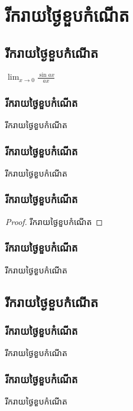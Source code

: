 \documentclass[11pt,a4paper]{diamond}
\begin{document}
	\frontmatter
	\tableofcontents
	\mainmatter
	\part{រីករាយថ្ងៃខួបកំណើត}
	\chapter{រីករាយថ្ងៃខួបកំណើត}
	\begin{definition}
		$\lim_{x\to0}\frac{\sin ax}{ax}$
	\end{definition}
	\section{រីករាយថ្ងៃខួបកំណើត}
	\begin{example}
		រីករាយថ្ងៃខួបកំណើត
	\end{example}
	\section{រីករាយថ្ងៃខួបកំណើត}
	\begin{theorem}
		រីករាយថ្ងៃខួបកំណើត
	\end{theorem}
	\section{រីករាយថ្ងៃខួបកំណើត}
	\begin{proof}
		រីករាយថ្ងៃខួបកំណើត
	\end{proof}
	\section{រីករាយថ្ងៃខួបកំណើត}
	\begin{proposition}
		រីករាយថ្ងៃខួបកំណើត
	\end{proposition}
	\chapter{រីករាយថ្ងៃខួបកំណើត}
	\section{រីករាយថ្ងៃខួបកំណើត}
	\begin{remark}
		រីករាយថ្ងៃខួបកំណើត
	\end{remark}
	\section{រីករាយថ្ងៃខួបកំណើត}
	\begin{exercise}
		រីករាយថ្ងៃខួបកំណើត
	\end{exercise}
\end{document}

